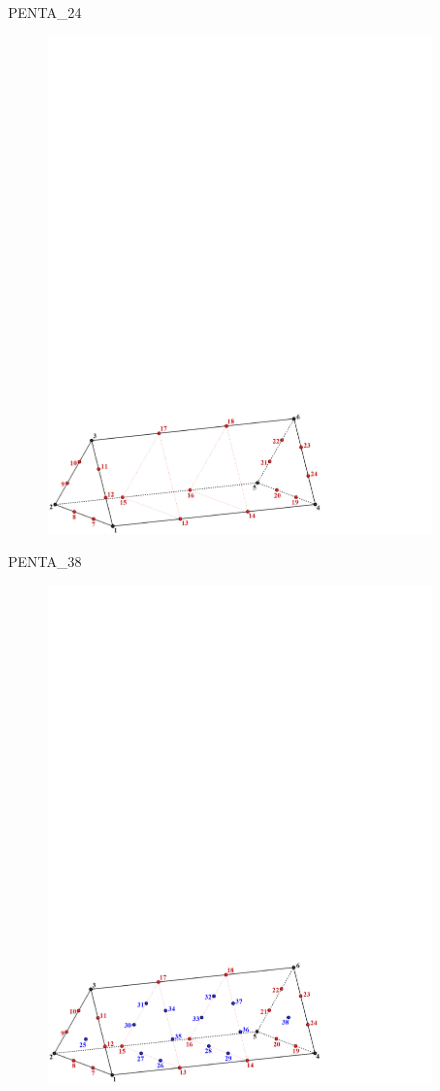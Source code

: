 {{{\newpage
{}

PENTA\_24
\begin{figure}[!htb]
   \includegraphics[width=4in]{conv.figs/TecplotFiles_Cubic_Element/All_Figures/prism_24}
\end{figure}

\bigskip

PENTA\_38
\begin{figure}[!htb]
   \includegraphics[width=4in]{conv.figs/TecplotFiles_Cubic_Element/All_Figures/prism_38}
\end{figure}

}}}
